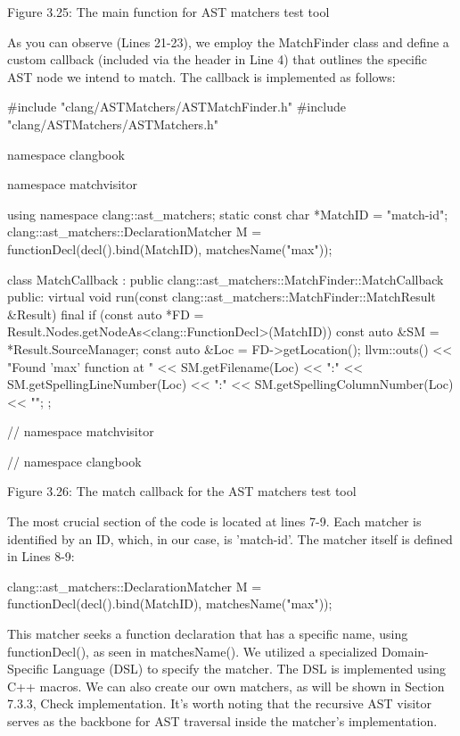 \begin{center}
Figure 3.25: The main function for AST matchers test tool
\end{center}

As you can observe (Lines 21-23), we employ the MatchFinder class and define a custom callback (included via the header in Line 4) that outlines the specific AST node we intend to match. The callback is implemented as follows:

\begin{cpp}
#include "clang/ASTMatchers/ASTMatchFinder.h"
#include "clang/ASTMatchers/ASTMatchers.h"

namespace clangbook {
namespace matchvisitor {
using namespace clang::ast_matchers;
static const char *MatchID = "match-id";
clang::ast_matchers::DeclarationMatcher M =
  functionDecl(decl().bind(MatchID), matchesName("max"));

class MatchCallback : public clang::ast_matchers::MatchFinder::MatchCallback {
public:
  virtual void
  run(const clang::ast_matchers::MatchFinder::MatchResult &Result) final {
    if (const auto *FD = Result.Nodes.getNodeAs<clang::FunctionDecl>(MatchID)) {
       const auto &SM = *Result.SourceManager;
       const auto &Loc = FD->getLocation();
       llvm::outs() << "Found 'max' function at " << SM.getFilename(Loc) << ":"
                    << SM.getSpellingLineNumber(Loc) << ":"
                    << SM.getSpellingColumnNumber(Loc) << "\n";
    }
   }
};


} // namespace matchvisitor
} // namespace clangbook
\end{cpp}

\begin{center}
Figure 3.26: The match callback for the AST matchers test tool
\end{center}

The most crucial section of the code is located at lines 7-9. Each matcher is identified by an ID, which, in our case, is 'match-id'. The matcher itself is defined in Lines 8-9:

\begin{cpp}
clang::ast_matchers::DeclarationMatcher M =
  functionDecl(decl().bind(MatchID), matchesName("max"));
\end{cpp}

This matcher seeks a function declaration that has a specific name, using functionDecl(), as seen in matchesName(). We utilized a specialized Domain-Specific Language (DSL) to specify the matcher. The DSL is implemented using C++ macros. We can also create our own matchers, as will be shown in Section 7.3.3, Check implementation. It's worth noting that the recursive AST visitor serves as the backbone for AST traversal inside the matcher's implementation.

